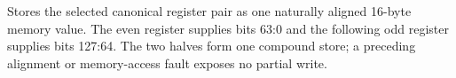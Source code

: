 Stores the selected canonical register pair as one naturally aligned 16-byte memory value. The even register
supplies bits 63:0 and the following odd register supplies bits 127:64. The two halves form one compound store;
a preceding alignment or memory-access fault exposes no partial write.
